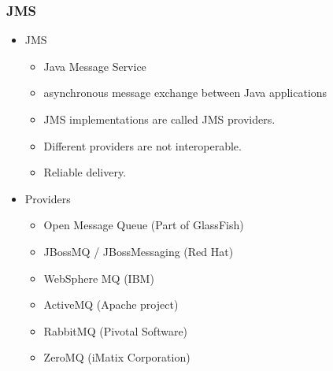 \documentclass[10pt,xcolor=pdflatex]{beamer}
\begin{document}
\begin{frame}[containsverbatim]\frametitle{JMS}
\begin{itemize}
	\item JMS
	  \begin{itemize}
        \item Java Message Service
		\item asynchronous message exchange between Java applications
		\item JMS implementations are called JMS providers.
		\item Different providers are not interoperable.
		\item Reliable delivery.
	  \end{itemize}
    \item Providers
      \begin{itemize}
        \item Open Message Queue (Part of GlassFish)
        \item JBossMQ / JBossMessaging (Red Hat)
    	\item WebSphere MQ (IBM)
		\item ActiveMQ (Apache project)
		\item RabbitMQ (Pivotal Software)
		\item ZeroMQ (iMatix Corporation)
      \end{itemize}
\end{itemize}
\end{frame}
\end{document}
